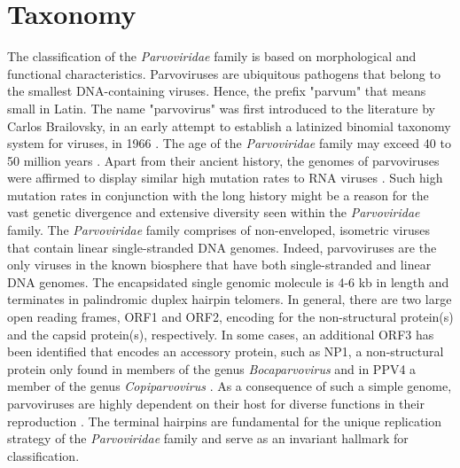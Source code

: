 
\chapter{Taxonomy} %

\label{Chapter2} %





\label{sec:Taxonomy}
The classification of the \textit{Parvoviridae} family is based on morphological and functional characteristics. Parvoviruses are ubiquitous pathogens that belong to the smallest DNA-containing viruses. Hence, the prefix "parvum" that means small in Latin. The name "parvovirus" was first introduced to the literature by Carlos Brailovsky, in an early attempt to establish a latinized binomial taxonomy system for viruses, in 1966 \cite{pmid5902774}. The age of the \textit{Parvoviridae} family may exceed 40 to 50 million years \cite{pmid20861255}. Apart from their ancient history, the genomes of parvoviruses were affirmed to display similar high mutation rates to RNA viruses \cite{pmid1649336, pmid12716974, pmid10411508, pmid16537636, pmid15626758, pmid21795474}. Such high mutation rates in conjunction with the long history might be a reason for the vast genetic divergence and extensive diversity seen within the \textit{Parvoviridae} family.      
The \textit{Parvoviridae} family comprises of non-enveloped, isometric viruses that contain linear single-stranded DNA genomes. Indeed, parvoviruses are the only viruses in the known biosphere that have both single-stranded and linear DNA genomes. The encapsidated single genomic molecule is 4-6 kb in length and terminates in palindromic duplex hairpin telomers. In general, there are two large open reading frames, ORF1 and ORF2, encoding for the non-structural protein(s) and the capsid protein(s), respectively. In some cases, an additional ORF3 has been identified that encodes an accessory protein, such as NP1, a non-structural protein only found in members of the genus \textit{Bocaparvovirus} and in PPV4 a member of the genus \textit{Copiparvovirus} \cite{pmid6319731, pmid21049037, pmid20339886}. As a consequence of such a simple genome, parvoviruses are highly dependent on their host for diverse functions in their reproduction \cite{pmid3296697, pmid10497831}. The terminal hairpins are fundamental for the unique replication strategy of the \textit{Parvoviridae} family and serve as an invariant hallmark for classification.
